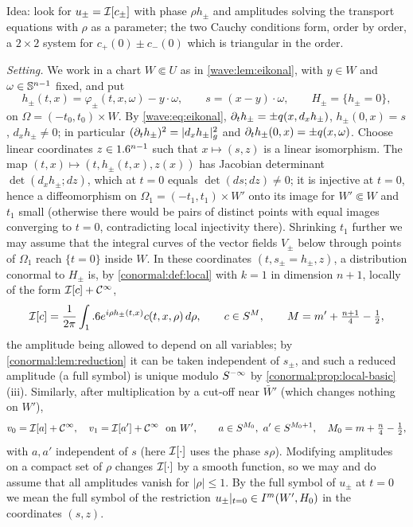 \subsection*{}
Idea: look for $u_\pm=\mathcal{I}[c_\pm]$ with phase $\rho h_\pm$ and amplitudes solving the transport
equations with $\rho$ as a parameter; the two Cauchy conditions form, order by order, a
$2\times2$ system for $c_{+}(0)\pm c_{-}(0)$ which is triangular in the order.

\emph{Setting.} We work in a chart $W\Subset U$ as in \cref{wave:lem:eikonal}, with $y\in W$ and
$\omega\in\mathbb{S}^{n-1}$ fixed, and put
\begin{equation*}
  h_\pm(t,x)=\varphi_\pm(t,x,\omega)-y\cdot\omega,\qquad s=(x-y)\cdot\omega,\qquad H_\pm=\{h_\pm=0\},
\end{equation*}
on $\Omega=(-t_0,t_0)\times W$. By \eqref{wave:eq:eikonal}, $\partial_th_\pm=\pm q(x,d_xh_\pm)$,
$h_\pm(0,x)=s$, $d_xh_\pm\neq0$; in particular $(\partial_th_\pm)^2=|d_xh_\pm|_g^2$ and
$\partial_th_\pm(0,x)=\pm q(x,\omega)$. Choose linear coordinates $z\in1.6^{n-1}$ such that $x\mapsto(s,z)$
is a linear isomorphism. The map $(t,x)\mapsto(t,h_\pm(t,x),z(x))$ has Jacobian determinant
$\det(d_xh_\pm;dz)$, which at $t=0$ equals $\det(ds;dz)\ne0$; it is injective at $t=0$, hence a
diffeomorphism on $\Omega_1=(-t_1,t_1)\times W'$ onto its image for $W'\Subset W$ and $t_1$ small
(otherwise there would be pairs of distinct points with equal images converging to $t=0$,
contradicting local injectivity there). Shrinking $t_1$ further we may assume that the integral
curves of the vector fields $V_\pm$ below through points of $\Omega_1$ reach $\{t=0\}$ inside
$W$. In these coordinates $(t,s_\pm=h_\pm,z)$, a distribution conormal to $H_\pm$ is, by
\cref{conormal:def:local} with $k=1$ in dimension $n+1$, locally of the form $\mathcal{I}[c]+\mathcal{C}^\infty$,
\begin{equation*}
  \mathcal{I}[c]=\frac1{2\pi}\int_1.6 e^{i\rho h_\pm(t,x)}c(t,x,\rho)\,d\rho,\qquad c\in S^{M},\qquad
  M=m'+\tfrac{n+1}4-\tfrac12,
\end{equation*}
the amplitude being allowed to depend on all variables; by \cref{conormal:lem:reduction} it can
be taken independent of $s_\pm$, and such a reduced amplitude (a full symbol) is unique modulo
$S^{-\infty}$ by \cref{conormal:prop:local-basic}(iii). Similarly, after multiplication by a
cut-off near $\bar W'$ (which changes nothing on $W'$),
\begin{equation*}
  v_0=\osc{a}+\CI,\quad v_1=\osc{a'}+\CI\ \text{ on }W',\qquad a\in\Sym{M_0},\ a'\in\Sym{M_0+1},\quad
  M_0=m+\tfrac n4-\tfrac12,
\end{equation*}
with $a,a'$ independent of $s$ (here $\mathcal{I}[\cdot]$ uses the phase $s\rho$). Modifying amplitudes
on a compact set of $\rho$ changes $\mathcal{I}[\cdot]$ by a smooth function, so we may and do assume
that all amplitudes vanish for $|\rho|\le1$. By the full symbol of $u_\pm$ at $t=0$ we mean the
full symbol of the restriction $u_\pm|_{t=0}\in I^{m}(W',H_0)$ in the coordinates $(s,z)$.

